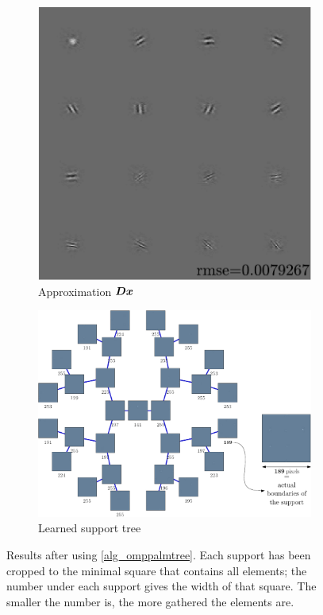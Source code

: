 \begin{figure}[!ht] \centering
\begin{subfigure}[b]{0.41\textwidth}\centering
\includegraphics[width=1\textwidth]{figures/tree-scattered-supports/xp_learnsupp256_curvelet_decomp3+tree-binary_dpth4+supp-diracs+usegrad0_every5_add5_totinit0_totadd279_a0_b1_approx.pdf}
\caption{Approximation $\bm{D}\bm{x}$}
\end{subfigure}
\begin{subfigure}[b]{0.56\textwidth}\centering
\includegraphics[width=1\textwidth]{figures/tree-scattered-supports/tree.pdf}
	\caption{Learned support tree}\label{fig_test_omppalmtree-tree}
\end{subfigure}
\caption{Results after using \cref{alg_omppalmtree}. Each support has been cropped to the minimal square that contains all elements; the number under each support gives the width of that square. The smaller the number is, the more gathered the elements are.}\label{fig_test_omppalmtree}
\end{figure}

